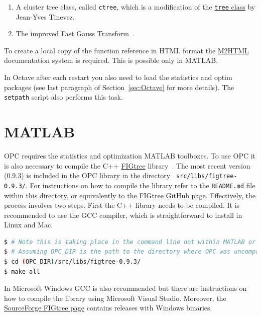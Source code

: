 \documentclass{book}
\begin{document}
\begin{enumerate}

\item A cluster tree class, called {\tt ctree}\/, which is a
modification of the
\href{https://uk.mathworks.com/matlabcentral/fileexchange/35623-tree-data-structure-as-a-matlab-class}
{{\tt tree} class} by
Jean-Yves Tinevez.

\item The
\href{http://www.umiacs.umd.edu/~morariu/figtree/}
{improved Fast Gauss Transform}~\cite{Morariu08}.

\end{enumerate}

\noindent
%
To create a local copy of the function reference in HTML format the
%
\href{https://www.artefact.tk/software/matlab/m2html/}{M2HTML}
%
documentation system is required. This is possible only in MATLAB.



\noindent
%
In Octave after each restart you also need to load the statistics and optim
packages (see last paragraph of Section~\ref{sec:Octave} for more details). 
The {\tt setpath} script also performs this task.


\section{MATLAB}

OPC requires the statistics and optimization MATLAB toolboxes. 
To use OPC it is also necessary
to compile the C++
\href{https://github.com/vmorariu/figtree}{FIGtree}
library~\cite{Morariu08}.
%
The most recent version (0.9.3) is included in the OPC library in the directory {\tt
src/libs/figtree-0.9.3/}. For instructions on how to compile the library
refer to the {\tt README.md} file within this directory, or equivalently
to the \href{https://github.com/vmorariu/figtree}{FIGtree GitHub page}.
Effectively, the process involves two steps. First the C++ library needs to be compiled.
It is recommended to use the GCC compiler, which is straightforward to install
in Linux and Mac.

\begin{lstlisting}[language=Bash]
$ # Note this is taking place in the command line not within MATLAB or Octave
$ # Assuming OPC_DIR is the path to the directory where OPC was uncompressed
$ cd (OPC_DIR)/src/libs/figtree-0.9.3/
$ make all
\end{lstlisting}


\noindent
%
In Microsoft Windows GCC is also recommended but there are instructions on how
to compile the library using Microsoft Visual Studio. Moreover,
the \href{http://sourceforge.net/projects/figtree}{SourceForge FIGtree page}
contains releases with Windows binaries.
\end{document}
